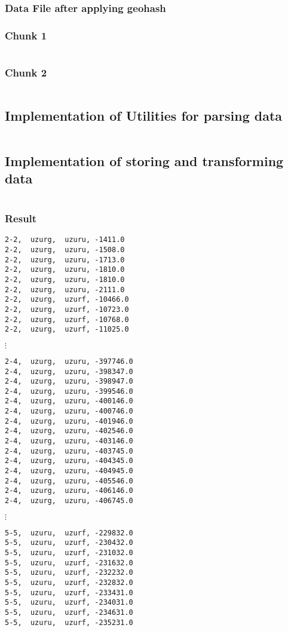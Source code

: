 \documentclass[paper=letter, fontsize=12pt]{article}
\begin{document}
\subsubsection{Data File after applying geohash}\label{geo-hashed}
\subsubsection{Chunk 1}\label{hash-chunk-1}
\inputminted[firstline=0,lastline=10]{text}{../file2.txt}
\subsubsection{Chunk 2}\label{hash-chunk-2}
\inputminted[firstline=2050,lastline=2060]{text}{../file2.txt}

\subsection{Implementation of Utilities for parsing data}\label{data-read}
\inputminted{python}{../simulator.py}

\subsection{Implementation of storing and transforming data}\label{data-transformation}
\inputminted{python}{../main.py}

\subsubsection{Result}\label{result}
\begin{verbatim}
2-2,  uzurg,  uzuru, -1411.0 
2-2,  uzurg,  uzuru, -1508.0 
2-2,  uzurg,  uzuru, -1713.0 
2-2,  uzurg,  uzuru, -1810.0 
2-2,  uzurg,  uzuru, -1810.0 
2-2,  uzurg,  uzuru, -2111.0 
2-2,  uzurg,  uzurf, -10466.0 
2-2,  uzurg,  uzurf, -10723.0 
2-2,  uzurg,  uzurf, -10768.0 
2-2,  uzurg,  uzurf, -11025.0 
\end{verbatim}
$ \vdots $
\begin{verbatim}
2-4,  uzurg,  uzuru, -397746.0 
2-4,  uzurg,  uzuru, -398347.0 
2-4,  uzurg,  uzuru, -398947.0 
2-4,  uzurg,  uzuru, -399546.0 
2-4,  uzurg,  uzuru, -400146.0 
2-4,  uzurg,  uzuru, -400746.0 
2-4,  uzurg,  uzuru, -401946.0 
2-4,  uzurg,  uzuru, -402546.0 
2-4,  uzurg,  uzuru, -403146.0 
2-4,  uzurg,  uzuru, -403745.0 
2-4,  uzurg,  uzuru, -404345.0 
2-4,  uzurg,  uzuru, -404945.0 
2-4,  uzurg,  uzuru, -405546.0 
2-4,  uzurg,  uzuru, -406146.0 
2-4,  uzurg,  uzuru, -406745.0 
\end{verbatim}
$ \vdots $
\begin{verbatim}
5-5,  uzuru,  uzurf, -229832.0 
5-5,  uzuru,  uzurf, -230432.0 
5-5,  uzuru,  uzurf, -231032.0 
5-5,  uzuru,  uzurf, -231632.0 
5-5,  uzuru,  uzurf, -232232.0 
5-5,  uzuru,  uzurf, -232832.0 
5-5,  uzuru,  uzurf, -233431.0 
5-5,  uzuru,  uzurf, -234031.0 
5-5,  uzuru,  uzurf, -234631.0 
5-5,  uzuru,  uzurf, -235231.0 
\end{verbatim}
\end{document}

